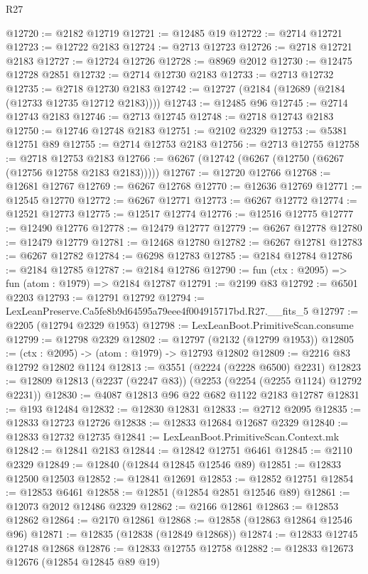 \begin{lexlean}{R27}
\begin{coremodule}
@12720 := @2182 @12719
@12721 := @12485 @19
@12722 := @2714 @12721
@12723 := @12722 @2183
@12724 := @2713 @12723
@12726 := @2718 @12721 @2183
@12727 := @12724 @12726
@12728 := @8969 @2012
@12730 := @12475 @12728 @2851
@12732 := @2714 @12730 @2183
@12733 := @2713 @12732
@12735 := @2718 @12730 @2183
@12742 := @12727 (@2184 (@12689 (@2184 (@12733 @12735 @12712 @2183))))
@12743 := @12485 @96
@12745 := @2714 @12743 @2183
@12746 := @2713 @12745
@12748 := @2718 @12743 @2183
@12750 := @12746 @12748 @2183
@12751 := @2102 @2329
@12753 := @5381 @12751 @89
@12755 := @2714 @12753 @2183
@12756 := @2713 @12755
@12758 := @2718 @12753 @2183
@12766 := @6267 (@12742 (@6267 (@12750 (@6267 (@12756 @12758 @2183 @2183)))))
@12767 := @12720 @12766
@12768 := @12681 @12767
@12769 := @6267 @12768
@12770 := @12636 @12769
@12771 := @12545 @12770
@12772 := @6267 @12771
@12773 := @6267 @12772
@12774 := @12521 @12773
@12775 := @12517 @12774
@12776 := @12516 @12775
@12777 := @12490 @12776
@12778 := @12479 @12777
@12779 := @6267 @12778
@12780 := @12479 @12779
@12781 := @12468 @12780
@12782 := @6267 @12781
@12783 := @6267 @12782
@12784 := @6298 @12783
@12785 := @2184 @12784
@12786 := @2184 @12785
@12787 := @2184 @12786
@12790 := fun (ctx : @2095) => fun (atom : @1979) => @2184 @12787
@12791 := @2199 @83
@12792 := @6501 @2203
@12793 := @12791 @12792
@12794 := LexLeanPreserve.Ca5fe8b9d64595a79eee4f004915717bd.R27.__fits_5
@12797 := @2205 (@12794 @2329 @1953)
@12798 := LexLeanBoot.PrimitiveScan.consume
@12799 := @12798 @2329
@12802 := @12797 (@2132 (@12799 @1953))
@12805 := (ctx : @2095) -> (atom : @1979) -> @12793 @12802
@12809 := @2216 @83 @12792 @12802 @1124
@12813 := @3551 (@2224 (@2228 @6500) @2231)
@12823 := @12809 @12813 (@2237 (@2247 @83)) (@2253 (@2254 (@2255 @1124) @12792 @2231))
@12830 := @4087 @12813 @96 @22 @682 @1122 @2183 @12787
@12831 := @193 @12484
@12832 := @12830 @12831
@12833 := @2712 @2095
@12835 := @12833 @12723 @12726
@12838 := @12833 @12684 @12687 @2329
@12840 := @12833 @12732 @12735
@12841 := LexLeanBoot.PrimitiveScan.Context.mk
@12842 := @12841 @2183
@12844 := @12842 @12751 @6461
@12845 := @2110 @2329
@12849 := @12840 (@12844 @12845 @12546 @89)
@12851 := @12833 @12500 @12503
@12852 := @12841 @12691
@12853 := @12852 @12751
@12854 := @12853 @6461
@12858 := @12851 (@12854 @2851 @12546 @89)
@12861 := @12073 @2012 @12486 @2329
@12862 := @2166 @12861
@12863 := @12853 @12862
@12864 := @2170 @12861
@12868 := @12858 (@12863 @12864 @12546 @96)
@12871 := @12835 (@12838 (@12849 @12868))
@12874 := @12833 @12745 @12748 @12868
@12876 := @12833 @12755 @12758
@12882 := @12833 @12673 @12676 (@12854 @12845 @89 @19)

\end{coremodule}
\end{lexlean}
